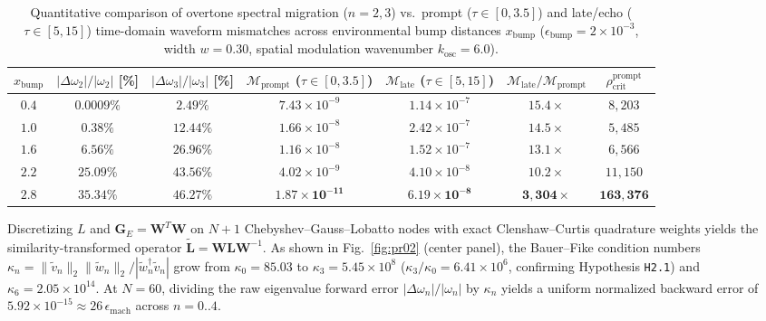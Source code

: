 \documentclass[11pt,a4paper]{article}
\begin{document}
\begin{table}[t!]
\centering
\caption{Quantitative comparison of overtone spectral migration ($n = 2, 3$) vs.\ prompt ($\tau \in [0, 3.5]$) and late/echo ($\tau \in [5, 15]$) time-domain waveform mismatches across environmental bump distances $x_{\mathrm{bump}}$ ($\epsilon_{\mathrm{bump}} = 2 \times 10^{-3}$, width $w = 0.30$, spatial modulation wavenumber $k_{\mathrm{osc}} = 6.0$).}
\label{tab:exp06}
\vspace{0.4em}
\small
\begin{tabular}{ccccccc}
\toprule
$x_{\mathrm{bump}}$ & $|\Delta\omega_2|/|\omega_2|$ [\%] & $|\Delta\omega_3|/|\omega_3|$ [\%] & $\mathcal{M}_{\mathrm{prompt}}$ ($\tau \in [0, 3.5]$) & $\mathcal{M}_{\mathrm{late}}$ ($\tau \in [5, 15]$) & $\mathcal{M}_{\mathrm{late}} / \mathcal{M}_{\mathrm{prompt}}$ & $\rho_{\mathrm{crit}}^{\mathrm{prompt}}$ \\
\midrule
$0.4$ & $0.0009\%$ & $2.49\%$ & $7.43 \times 10^{-9}$ & $1.14 \times 10^{-7}$ & $15.4\times$ & $8,203$ \\
$1.0$ & $0.38\%$ & $12.44\%$ & $1.66 \times 10^{-8}$ & $2.42 \times 10^{-7}$ & $14.5\times$ & $5,485$ \\
$1.6$ & $6.56\%$ & $26.96\%$ & $1.16 \times 10^{-8}$ & $1.52 \times 10^{-7}$ & $13.1\times$ & $6,566$ \\
$2.2$ & $25.09\%$ & $43.56\%$ & $4.02 \times 10^{-9}$ & $4.10 \times 10^{-8}$ & $10.2\times$ & $11,150$ \\
$\mathbf{2.8}$ & $\mathbf{35.34\%}$ & $\mathbf{46.27\%}$ & $\mathbf{1.87 \times 10^{-11}}$ & $\mathbf{6.19 \times 10^{-8}}$ & $\mathbf{3,304\times}$ & $\mathbf{163,376}$ \\
\bottomrule
\end{tabular}
\end{table}

Discretizing $L$ and $\mathbf{G}_E = \mathbf{W}^T\mathbf{W}$ on $N+1$ Chebyshev--Gauss--Lobatto nodes with exact Clenshaw--Curtis quadrature weights yields the similarity-transformed operator $\tilde{\mathbf{L}} = \mathbf{W}\mathbf{L}\mathbf{W}^{-1}$. As shown in Fig.~\ref{fig:pr02} (center panel), the Bauer--Fike condition numbers $\kappa_n = \|\tilde{v}_n\|_2 \|\tilde{w}_n\|_2 / |\tilde{w}_n^\dagger \tilde{v}_n|$ grow from $\kappa_0 = 85.03$ to $\kappa_3 = 5.45 \times 10^8$ ($\kappa_3/\kappa_0 = 6.41 \times 10^6$, confirming Hypothesis \texttt{H2.1}) and $\kappa_6 = 2.05 \times 10^{14}$. At $N = 60$, dividing the raw eigenvalue forward error $|\Delta\omega_n|/|\omega_n|$ by $\kappa_n$ yields a uniform normalized backward error of $5.92 \times 10^{-15} \approx 26\,\epsilon_{\mathrm{mach}}$ across $n = 0..4$.
\end{document}
